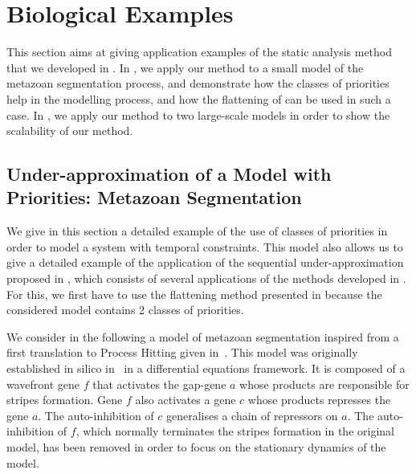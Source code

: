 
\section{Biological Examples}\label{sec:example}

This section aims at giving application examples of the static analysis method
that we developed in .
In , we apply our method to a small model of the
metazoan segmentation process,
and demonstrate how the classes of priorities help in the modelling process,
and how the flattening of 
can be used in such a case.
In , we apply our method to two large-scale models
in order to show the scalability of our method.



\subsection{Under-approximation of a Model with Priorities: Metazoan Segmentation}
\label{ssec:ex-metazoan}


We give in this section a detailed example of the use of classes of priorities
in order to model a system with temporal constraints.
This model also allows us to give a detailed example of the application of the sequential
under-approximation proposed in ,
which consists of several applications of the methods developed in
.
For this, we first have to use the flattening method presented in 
because the considered model contains 2 classes of priorities.

We consider in the following a model of metazoan segmentation
inspired from a first translation to Process Hitting given in~\cite{PMR10-TCSB}.
This model was originally established in silico in~\cite{MSB:MSB4100192}
in a differential equations framework.
It is composed of a wavefront gene $f$ that activates the gap-gene $a$ whose products are responsible for stripes formation.
Gene $f$ also activates a gene $c$ whose products represses the gene $a$.
The auto-inhibition of $c$ generalises a chain of repressors on $a$.
The auto-inhibition of $f$, which normally terminates
the stripes formation in the original model,
has been removed in order to focus on the stationary dynamics of the model.

